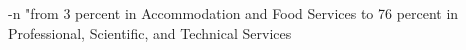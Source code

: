 -n "from 3 percent in Accommodation and Food Services to 76 percent in Professional, Scientific, and Technical Services%
